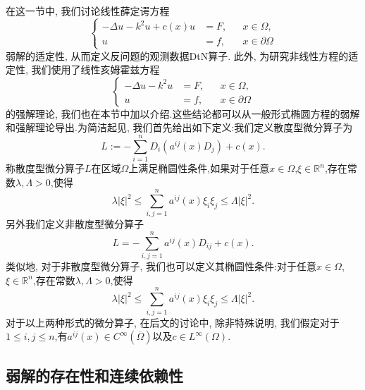 \documentclass[a4paper,punct=banjiao,twoside]{ctexrep}
\theoremstyle{plain}
\theoremstyle{definition}
\theoremstyle{remark}
\begin{document}
在这一节中, 我们讨论线性薛定谔方程
\begin{equation}\label{eq:schrodinger-0}
\left\{\begin{aligned}
-\Delta u - k^2 u +c(x)u &=F, && x\in\Omega,\\
u &=f, && x\in\partial\Omega
\end{aligned}\right.
\end{equation}
弱解的适定性, 从而定义反问题的观测数据DtN算子. 此外, 为研究非线性方程的适定性, 我们使用了线性亥姆霍兹方程
\begin{equation}\label{eqn:Helmholtz}
\left\{\begin{aligned}
-\Delta u - k^2 u &=F, && x\in\Omega,\\
u &=f, && x\in\partial\Omega
\end{aligned}\right.
\end{equation}
的强解理论, 我们也在本节中加以介绍.这些结论都可以从一般形式椭圆方程的弱解和强解理论导出.为简洁起见, 我们首先给出如下定义:我们定义散度型微分算子为
\begin{equation}\label{eq:divergence-form}
L:=-\sum_{i=1}^n D_i(a^{ij}(x)D_{j})+c(x).
\end{equation}
称散度型微分算子$L$在区域$\Omega$上满足椭圆性条件,如果对于任意$x\in\Omega$,$\xi\in\mathbb{R}^n$,存在常数$\lambda,\Lambda>0$,使得
\begin{equation}\label{eq:strict-elliptic}
\lambda |\xi|^2 \leq \sum_{i,j=1}^n a^{ij}(x)\xi_{i}\xi_{j} \leq \Lambda|\xi|^2 .
\end{equation}
另外我们定义非散度型微分算子
\begin{equation}\label{eq:nondivergence-form}
L=-\sum_{i,j=1}^{n}a^{ij}(x)D_{ij} + c(x).
\end{equation}
类似地, 对于非散度型微分算子, 我们也可以定义其椭圆性条件:对于任意$x\in\Omega$,$\xi\in\mathbb{R}^n$,存在常数$\lambda,\Lambda>0$,使得
\begin{equation*}
\lambda |\xi|^2 \leq \sum_{i,j=1}^n a^{ij}(x)\xi_{i}\xi_{j} \leq \Lambda|\xi|^2 .
\end{equation*}
对于以上两种形式的微分算子, 在后文的讨论中, 除非特殊说明, 我们假定对于$1\leq i,j\leq n$,有$a^{ij}(x)\in C^{\infty}(\overline{\Omega})$以及$c\in L^{\infty}(\Omega)$.

\subsection{弱解的存在性和连续依赖性}\label{sec:weak-solution}
\end{document}
